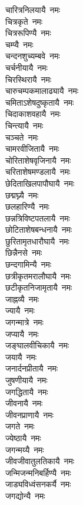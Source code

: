 \begin{multicols}{\maxColumns}
\begin{flushleft}
चारित्रनिलयायै~नमः\\
चित्रकृते~नमः\\
चित्ररूपिण्यै~नमः\\
चम्प्वै~नमः\\
चन्दनशुच्यम्बवे~नमः\\
चर्चनीयायै~नमः\\
चिरस्थिरायै~नमः\hfill{}\\
चारुचम्पकमालाढ्यायै~नमः\\
चमिताऽशेषदुष्कृतायै~नमः\\
चिदाकाशवहायै~नमः\\
चिन्त्यायै~नमः\\
चञ्चते~नमः\\
चामरवीजितायै~नमः\\
चोरिताशेषवृजिनायै~नमः\\
चरिताशेषमण्डलायै~नमः\\
छेदिताखिलपापौघायै~नमः\\
छद्मघ्न्यै~नमः\hfill{}\\
छलहारिण्यै~नमः\\
छन्नत्रिविष्टपतलायै~नमः\\
छोटिताशेषबन्धनायै~नमः\\
छुरितामृतधारौघायै~नमः\\
छिन्नैनसे~नमः\\
छन्दगामिन्यै~नमः\\
छत्रीकृतमरालौघायै~नमः\\
छटीकृतनिजामृतायै~नमः\\
जाह्नव्यै~नमः\\
ज्यायै~नमः\hfill{}\\
जगन्मात्रे~नमः\\
जप्यायै~नमः\\
जङ्घालवीचिकायै~नमः\\
जयायै~नमः\\
जनार्दनप्रीतायै~नमः\\
जुषणीयायै~नमः\\
जगद्धितायै~नमः\\
जीवनायै~नमः\\
जीवनप्राणायै~नमः\\
जगते~नमः\hfill{}\\
ज्येष्ठायै~नमः\\
जगन्मय्यै~नमः\\
जीवजीवातुलतिकायै~नमः\\
जन्मिजन्मनिबर्हिण्यै~नमः\\
जाड्यविध्वंसनकर्यै~नमः\\
जगद्योन्यै~नमः\\

\end{flushleft}
\end{multicols}
